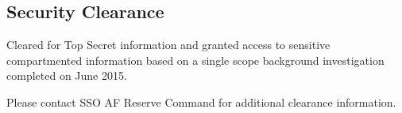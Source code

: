 \subsection*{Security Clearance}
{}
Cleared for Top Secret information and granted access to sensitive compartmented information based on a single scope background investigation completed on June 2015.

Please contact SSO AF Reserve Command for additional clearance information.
